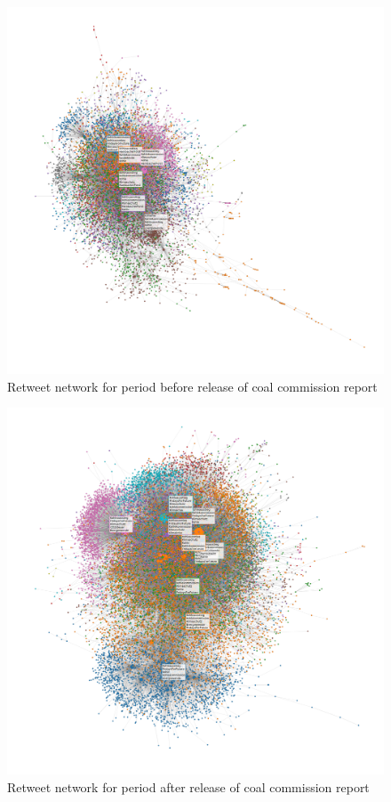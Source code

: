 \documentclass[12pt,onecolumn,twoside]{layout}
\begin{document}
\begin{figure} 
	\begin{center}
		\includegraphics[width=\linewidth]{figures/rt_network_ht_period4}
	\end{center}
	\caption{Retweet network for period before release of coal commission report}
	\label{fig:rt_network_bef}
\end{figure}	
\begin{figure} 
	\begin{center}
		\includegraphics[width=\linewidth]{figures/rt_network_ht_period3}
	\end{center}
	\caption{Retweet network for period after release of coal commission report}
	\label{fig:rt_network_aft}
\end{figure}
\end{document}
